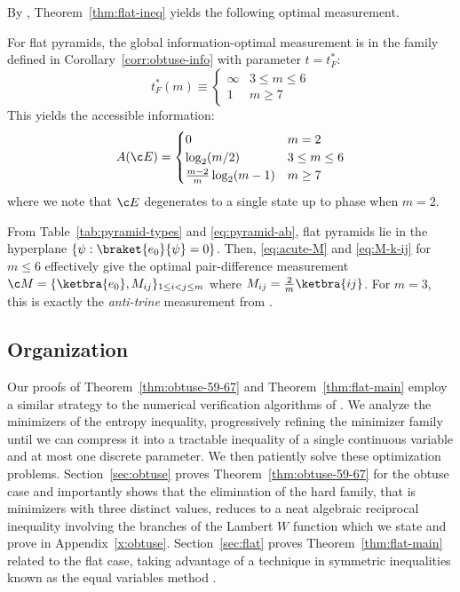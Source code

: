 \documentclass[11pt]{article}
\begin{document}
By \citep{holevo2025quantum}, Theorem~\ref{thm:flat-ineq} yields the following optimal measurement.
\begin{corollary}
    For flat pyramids, the global information-optimal measurement is in the family defined in Corollary~\ref{corr:obtuse-info} with parameter $t=t^*_F$:
    \begin{equation}
        t^*_F(m)\equiv \begin{cases}
            \infty & 3\leq m \leq 6\\
            1 & m \geq 7
        \end{cases}
    \end{equation}
    This yields the accessible information:
    \begin{equation}
        A({\c E })=\begin{cases}
            0 & m=2\\
            \log_2(m/2) & 3\leq m \leq 6\\
            \frac{m-2}{m}\log_2(m-1) & m \geq 7
        \end{cases}
    \end{equation}
    where we note that ${\c E}$ degenerates to a single state up to phase when $m=2$.
\end{corollary}
From Table~\ref{tab:pyramid-types} and \eqref{eq:pyramid-ab}, flat pyramids lie in the hyperplane $\{\psi:\braket{e_0}{\psi}=0\}$. Then, \eqref{eq:acute-M} and \eqref{eq:M-k-ij} for $m\leq 6$ effectively give the optimal pair-difference measurement ${\c M}=\{\ketbra{e_0},M_{ij}\}_{1\leq i<j\leq m}$ where $M_{ij}=\frac 2 m \ketbra{ij}$. For $m=3$, this is exactly the \textit{anti-trine} measurement from \citep{weir2018optimal}. 

\subsection{Organization}
Our proofs of Theorem~\ref{thm:obtuse-59-67} and Theorem~\ref{thm:flat-main} employ a similar strategy to the numerical verification algorithms of \citep{holevo2025quantum,holevo2026conjecturetightnorminequality}. We analyze the minimizers of the entropy inequality, progressively refining the minimizer family until we can compress it into a tractable inequality of a single continuous variable and at most one discrete parameter. We then patiently solve these optimization problems. Section~\ref{sec:obtuse} proves Theorem~\ref{thm:obtuse-59-67} for the obtuse case and importantly shows that the elimination of the hard family, that is minimizers with three distinct values, reduces to a neat algebraic reciprocal inequality involving the branches of the Lambert $W$ function which we state and prove in Appendix~\ref{x:obtuse}. Section~\ref{sec:flat} proves Theorem~\ref{thm:flat-main} related to the flat case, taking advantage of a technique in symmetric inequalities known as the equal variables method \citep{cirtoaje2006algebraic}.
% 
\end{document}
